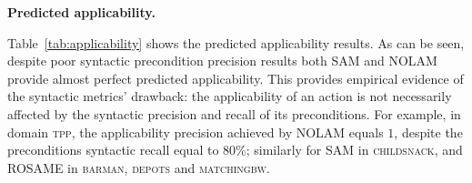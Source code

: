 \documentclass[letterpaper]{article} %
\newcommand{\nolam}{NOLAM\xspace}
\newcommand{\offlam}{OffLAM\xspace}
\newcommand{\rosame}{ROSAME\xspace}
\newcommand{\samshort}{SAM\xspace}
\newcommand{\miniparagraph}[1]{\textbf{#1.}}
\newif\ifaddcomments
\newcommand{\roni}[1]{\ifaddcomments{\textcolor{red}{[Roni: #1]}}\fi}
\newcommand{\leo}[1]{\ifaddcomments{\textcolor{pink}{[Leonardo: #1]}}\fi}
\begin{document}



\miniparagraph{Predicted applicability} 
%

%
Table~\ref{tab:applicability} shows the predicted applicability results. As can be seen, despite poor syntactic precondition precision results both \samshort and \nolam provide almost perfect predicted applicability. This provides empirical evidence of the syntactic metrics' drawback: the applicability of an action is not necessarily affected by the syntactic precision and recall of its preconditions. For example, in domain \textsc{tpp}, the applicability precision achieved by \nolam equals $1$, despite the preconditions syntactic recall equal to $80\%$; similarly for \samshort in \textsc{childsnack}, and \rosame in \textsc{barman}, \textsc{depots} and \textsc{matchingbw}. 


\end{document}
